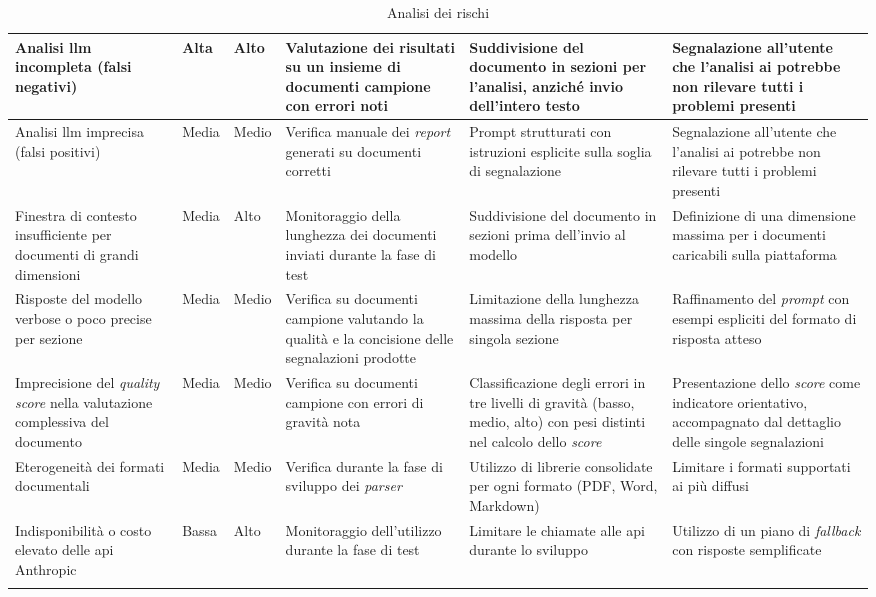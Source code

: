 \begin{longtable}{L{2.2cm}|L{1.5cm}|L{1.5cm}|L{2.5cm}|L{2.5cm}|L{2.5cm}}
Analisi \gls{llm} incompleta (falsi negativi) & Alta & Alto & Valutazione dei risultati su un insieme di documenti campione con errori noti & Suddivisione del documento in sezioni per l'analisi, anziché invio dell'intero testo & Segnalazione all'utente che l'analisi \gls{ai} potrebbe non rilevare tutti i problemi presenti \\
\hline
Analisi \gls{llm} imprecisa (falsi positivi) & Media & Medio & Verifica manuale dei \emph{report} generati su documenti corretti & Prompt strutturati con istruzioni esplicite sulla soglia di segnalazione & Segnalazione all'utente che l'analisi \gls{ai} potrebbe non rilevare tutti i problemi presenti \\
\hline
Finestra di contesto insufficiente per documenti di grandi dimensioni & Media & Alto & Monitoraggio della lunghezza dei documenti inviati durante la fase di test & Suddivisione del documento in sezioni prima dell'invio al modello & Definizione di una dimensione massima per i documenti caricabili sulla piattaforma \\
\hline
Risposte del modello verbose o poco precise per sezione & Media & Medio & Verifica su documenti campione valutando la qualità e la concisione delle segnalazioni prodotte & Limitazione della lunghezza massima della risposta per singola sezione & Raffinamento del \emph{prompt} con esempi espliciti del formato di risposta atteso \\
\hline
Imprecisione del \emph{quality score} nella valutazione complessiva del documento & Media & Medio & Verifica su documenti campione con errori di gravità nota & Classificazione degli errori in tre livelli di gravità (basso, medio, alto) con pesi distinti nel calcolo dello \emph{score} & Presentazione dello \emph{score} come indicatore orientativo, accompagnato dal dettaglio delle singole segnalazioni \\
\hline
Eterogeneità dei formati documentali & Media & Medio & Verifica durante la fase di sviluppo dei \emph{parser} & Utilizzo di librerie consolidate per ogni formato (PDF, Word, Markdown) & Limitare i formati supportati ai più diffusi \\
\hline
Indisponibilità o costo elevato delle \gls{api} Anthropic & Bassa & Alto & Monitoraggio dell'utilizzo durante la fase di test & Limitare le chiamate alle \gls{api} durante lo sviluppo & Utilizzo di un piano di \emph{fallback} con risposte semplificate \\
\caption{Analisi dei rischi}
\label{tab:rischi}
\end{longtable}
\endgroup